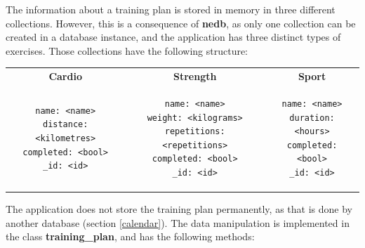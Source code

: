 \documentclass[12pt,twoside,titlepage,a4paper]{article}
\theoremstyle{definicion}
\theoremstyle{lema}
\theoremstyle{teorema}
\theoremstyle{corolario}
\theoremstyle{ejemplo}
\theoremstyle{nota}
\begin{document}
The information about a training plan is stored in memory in three different collections. However, this is a consequence of \textbf{nedb},
as only one collection can be created in a database instance, and the application has three distinct types of exercises. Those collections
have the following structure: \newline
\begin{tabular}{ccc}
	\textbf{Cardio} & \textbf{Strength} & \textbf{Sport} \\
	\begin{lstlisting}
name: <name>
distance: <kilometres>
completed: <bool>
_id: <id>
	\end{lstlisting} &
	\begin{lstlisting}
name: <name>
weight: <kilograms>
repetitions: <repetitions>
completed: <bool>
_id: <id>
	\end{lstlisting} &
	\begin{lstlisting}
name: <name>
duration: <hours>
completed: <bool>
_id: <id>
	\end{lstlisting} \\
\end{tabular}
\newline
The application does not store the training plan permanently, as that is done by another database (section \ref{calendar}). The data
manipulation is implemented in the class \textbf{training\_plan}, and has the following methods:
\end{document}
